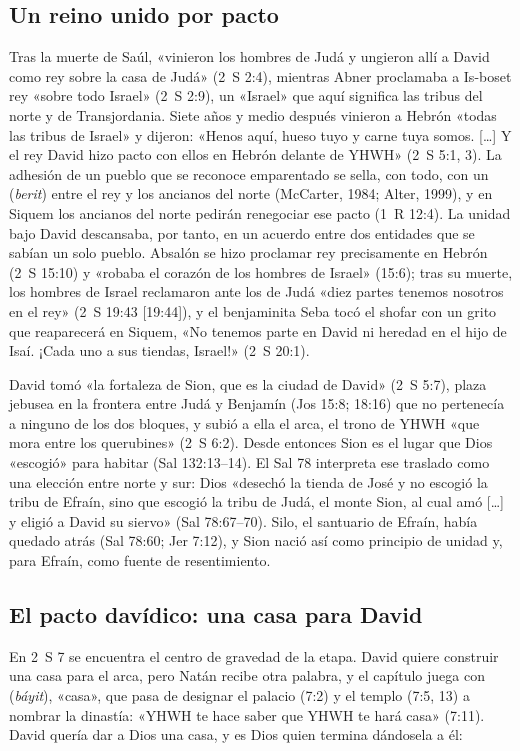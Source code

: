 \subsection{Un reino unido por pacto}
Tras la muerte de Saúl, «vinieron los hombres de Judá y ungieron allí a David como rey sobre la casa de Judá» (2~S 2:4), mientras Abner proclamaba a Is-boset rey «sobre todo Israel» (2~S 2:9), un «Israel» que aquí significa las tribus del norte y de Transjordania. Siete años y medio después vinieron a Hebrón «todas las tribus de Israel» y dijeron: «Henos aquí, hueso tuyo y carne tuya somos. [\ldots] Y el rey David hizo pacto con ellos en Hebrón delante de YHWH» (2~S 5:1, 3). La adhesión de un pueblo que se reconoce emparentado se sella, con todo, con un  (\emph{berit}) entre el rey y los ancianos del norte (McCarter, 1984; Alter, 1999), y en Siquem los ancianos del norte pedirán renegociar ese pacto (1~R 12:4). La unidad bajo David descansaba, por tanto, en un acuerdo entre dos entidades que se sabían un solo pueblo. Absalón se hizo proclamar rey precisamente en Hebrón (2~S 15:10) y «robaba el corazón de los hombres de Israel» (15:6); tras su muerte, los hombres de Israel reclamaron ante los de Judá «diez partes tenemos nosotros en el rey» (2~S 19:43 [19:44]), y el benjaminita Seba tocó el shofar con un grito que reaparecerá en Siquem, «No tenemos parte en David ni heredad en el hijo de Isaí. ¡Cada uno a sus tiendas, Israel!» (2~S 20:1).

David tomó «la fortaleza de Sion, que es la ciudad de David» (2~S 5:7), plaza jebusea en la frontera entre Judá y Benjamín (Jos 15:8; 18:16) que no pertenecía a ninguno de los dos bloques, y subió a ella el arca, el trono de YHWH «que mora entre los querubines» (2~S 6:2). Desde entonces Sion es el lugar que Dios «escogió» para habitar (Sal 132:13--14). El Sal 78 interpreta ese traslado como una elección entre norte y sur: Dios «desechó la tienda de José y no escogió la tribu de Efraín, sino que escogió la tribu de Judá, el monte Sion, al cual amó [\ldots] y eligió a David su siervo» (Sal 78:67--70). Silo, el santuario de Efraín, había quedado atrás (Sal 78:60; Jer 7:12), y Sion nació así como principio de unidad y, para Efraín, como fuente de resentimiento.

\subsection{El pacto davídico: una casa para David}
En 2~S 7 se encuentra el centro de gravedad de la etapa. David quiere construir una casa para el arca, pero Natán recibe otra palabra, y el capítulo juega con  (\emph{báyit}), «casa», que pasa de designar el palacio (7:2) y el templo (7:5, 13) a nombrar la dinastía: «YHWH te hace saber que YHWH te hará casa» (7:11). David quería dar a Dios una casa, y es Dios quien termina dándosela a él:

